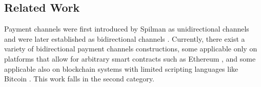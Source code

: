 \documentclass[twocolumn,showpacs,%
  nofootinbib,aps,superscriptaddress,%
  eqsecnum,prd,notitlepage,showkeys,10pt]{revtex4-1}
\newcommand{\authnote}[3]{{ \footnotesize \bf{#1[#2: #3]~}}} %
\newcommand{\edit}[1]{\authnote{\color{blue}}{edit}{#1}}
\newcommand{\sys}{\textsc{Cerberus}\xspace}
\begin{document}

\subsection{Related Work}
\label{sec:related}
Payment channels were first introduced by Spilman \cite{spilman2013channels} as unidirectional channels and were later established as bidirectional channels \cite{poon2015lightning,decker15fast}. Currently, there exist a variety of bidirectional payment channels constructions, some applicable only on platforms that allow for arbitrary smart contracts such as Ethereum \cite{dziembowski2017perun,Miller2017sprites,green2017bolt,avarikioti2019brick}, and some applicable also on blockchain systems with limited scripting languages like Bitcoin \cite{poon2015lightning,deckereltoo,decker15fast,avarikioti2018watchtowers}. This work falls in the second category.
\end{document}
